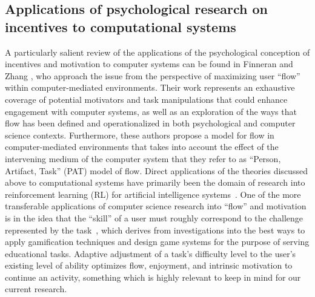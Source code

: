 \subsection{Applications of psychological research on incentives to computational systems}
A particularly salient review of the applications of the psychological conception of incentives and motivation to computer systems can be found in Finneran and Zhang \cite{Finneran05}, who approach the issue from the perspective of maximizing user “flow” within computer-mediated environments. Their work represents an exhaustive coverage of potential motivators and task manipulations that could enhance engagement with computer systems, as well as an exploration of the ways that flow has been defined and operationalized in both psychological and computer science contexts. Furthermore, these authors propose a model for flow in computer-mediated environments that takes into account the effect of the intervening medium of the computer system that they refer to as “Person, Artifact, Task” (PAT) model of flow. 
	Direct applications of the theories discussed above to computational systems have primarily been the domain of research into reinforcement learning (RL) for artificial intelligence systems~\cite{barto2004intrinsically, kiili2005digital,barto2005intrinsic}. 
One of the more transferable applications of computer science research into “flow” and motivation is in the idea that the “skill” of a user must roughly correspond to the challenge represented by the task~\cite{barto2004intrinsically,barto2005intrinsic}, which derives from investigations into the best ways to apply gamification techniques and design game systems for the purpose of serving educational tasks. Adaptive adjustment of a task’s difficulty level to the user’s existing level of ability optimizes flow, enjoyment, and intrinsic motivation to continue an activity, something which is highly relevant to keep in mind for our current research.

